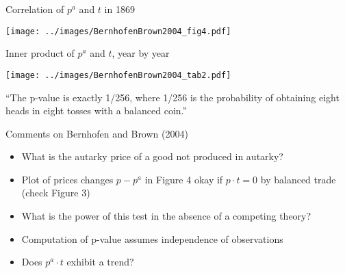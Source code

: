 \documentclass[11pt,notes=hide,aspectratio=169]{beamer}
\begin{document}
\begin{frame}{Correlation of $p^{a}$ and $t$ in 1869}
\begin{center}\texttt{[image: ../images/BernhofenBrown2004\_fig4.pdf]}\end{center}
\end{frame}
\begin{frame}{Inner product of $p^a$ and $t$, year by year}
\begin{center}\texttt{[image: ../images/BernhofenBrown2004\_tab2.pdf]}\end{center}
\vspace{-4mm}
{\footnotesize ``The p-value is exactly 1/256, where 1/256 is the probability of obtaining eight heads in eight tosses with a balanced coin.''\par}
\end{frame}
\begin{frame}{Comments on Bernhofen and Brown (2004)}
\begin{itemize}
	\item What is the autarky price of a good not produced in autarky?
	\item Plot of prices changes $p-p^{a}$ in Figure 4 okay if $p\cdot t = 0$ by balanced trade (check Figure 3)
	\item What is the power of this test in the absence of a competing theory?
	\item Computation of p-value assumes independence of observations
	\item Does $p^a \cdot t$ exhibit a trend?
\end{itemize}
\end{frame}
\end{document}
